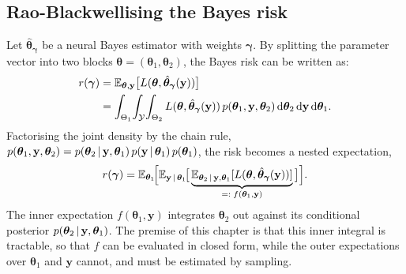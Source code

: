 \subsection{Rao-Blackwellising the Bayes risk}
\label{sec:rb-bayes-risk}

Let $\hat{\bm{\theta}}_{\bm{\gamma}}$ be a neural Bayes estimator with weights
$\bm{\gamma}$. By splitting the parameter vector into two blocks $\bm{\theta} =
(\bm{\theta}_1, \bm{\theta}_2)$, the Bayes risk can be written as:
%
\begin{equation}
  \begin{split}
    r(\bm{\gamma})
    &= \mathbb{E}_{\bm{\theta}, \mathbf{y}}
       \big[L(\bm{\theta},
       \hat{\bm{\theta}}_{\bm{\gamma}}(\mathbf{y}))\big] \\
    &= \int_{\Theta_1}\!\int_{\mathcal{Y}}\!\int_{\Theta_2}
       L(\bm{\theta},
       \hat{\bm{\theta}}_{\bm{\gamma}}(\mathbf{y}))\,
       p(\bm{\theta}_1, \mathbf{y}, \bm{\theta}_2)
       \,\mathrm{d}\bm{\theta}_2 \,\mathrm{d}\mathbf{y} \,\mathrm{d}\bm{\theta}_1.
  \end{split}
  \label{eq:risk-integral}
\end{equation}
%
Factorising the joint density by the chain rule,
$p(\bm{\theta}_1, \mathbf{y}, \bm{\theta}_2) =
p(\bm{\theta}_2 \,|\, \mathbf{y}, \bm{\theta}_1)\,
p(\mathbf{y} \,|\, \bm{\theta}_1)\,p(\bm{\theta}_1)$, the
risk becomes a nested expectation,
%
\begin{equation}
  r(\bm{\gamma})
  = \mathbb{E}_{\bm{\theta}_1}\!\Big[
    \mathbb{E}_{\mathbf{y} \,|\, \bm{\theta}_1}\!\big[
    \underbrace{\mathbb{E}_{\bm{\theta}_2 \,|\, \mathbf{y}, \bm{\theta}_1}
    [L(\bm{\theta}, \hat{\bm{\theta}}_{\bm{\gamma}}(\mathbf{y}))]}
    _{=:\; f(\bm{\theta}_1, \mathbf{y})}\big]\Big].
  \label{eq:nested-risk}
\end{equation}
%
The inner expectation $f(\bm{\theta}_1, \mathbf{y})$ integrates
$\bm{\theta}_2$ out against its conditional posterior
$p(\bm{\theta}_2 \,|\, \mathbf{y}, \bm{\theta}_1)$. The premise of
this chapter is that this inner integral is tractable, so that $f$ can
be evaluated in closed form, while the outer expectations over
$\bm{\theta}_1$ and $\mathbf{y}$ cannot, and must be estimated by
sampling.

